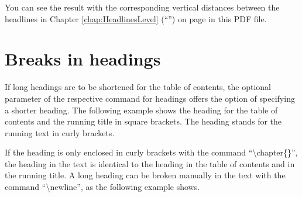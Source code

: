 You can see the result with the corresponding vertical distances between the headlines in Chapter \ref{chap:HeadlinesLevel} (``'') on page \pageref{chap:HeadlinesLevel} in this PDF file.




\section{Breaks in headings}
\label{sec:Breaks in headings}
If long headings are to be shortened for the table of contents, the optional parameter of the respective command for headings offers the option of specifying a shorter heading. The following example shows the heading for the table of contents and the running title in square brackets. The heading stands for the running text in curly brackets.



If the heading is only enclosed in curly brackets with the command ``\textbackslash chapter\{\}'', the heading in the text is identical to the heading in the table of contents and in the running title. A long heading can be broken manually in the text with the command ``\textbackslash newline'', as the following example shows.



